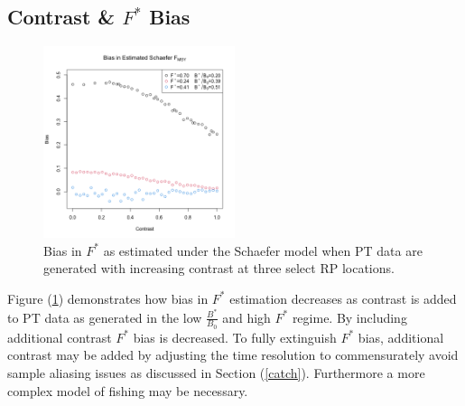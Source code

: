 \subsection{Contrast \& $F^*$ Bias}

%
\begin{figure}
\vspace{-1.5cm}
\includegraphics[width=0.5\textwidth]{../ptNew/contrastTest3.png}
\caption{
Bias in $F^*$ as estimated under the Schaefer model when PT data are generated
with increasing contrast at three select RP locations. 
\label{conTest}}
\end{figure}

%
Figure (\ref{conTest}) demonstrates how bias in $F^*$ estimation %
decreases as contrast is added to PT data as generated in the low $\frac{B^*}{B_0}$ and
high $F^*$ regime. By including additional contrast $F^*$ bias is decreased. To fully 
extinguish $F^*$ bias, additional contrast may be added by adjusting the time resolution 
to commensurately avoid sample aliasing issues as discussed in Section (\ref{catch}). 
Furthermore a more complex model of fishing may be necessary.  

